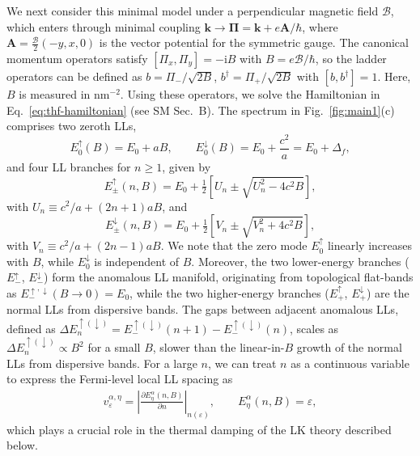 \documentclass[prl,twocolumn,superscriptaddress,float,aps]{revtex4-2}
\newcommand{\ii}{\mathrm{i}}
\newcommand{\kk}{\mathbf{k}}
\newcommand{\ELLminus}{E^{\uparrow}_{-}}
\newcommand{\ELLplus}{E^{\uparrow}_{+}}
\newcommand{\ELLTRminus}{E^{\downarrow}_{-}}
\newcommand{\ELLTRplus}{E^{\downarrow}_{+}}
\newcommand{\ELLzero}{E^{\uparrow}_{0}}
\newcommand{\ELLTRzero}{E^{\downarrow}_{0}}
\newcommand{\ELLpm}{E^{\uparrow}_{\pm}}
\newcommand{\ELLTRpm}{E^{\downarrow}_{\pm}}
\begin{document}
We next consider this minimal model under a perpendicular magnetic field $\mathcal{B}$, which enters through minimal coupling $\kk\to\boldsymbol{\Pi} = \kk + e\mathbf{A}/\hbar$, where $\mathbf{A} = \frac{\mathcal{B}}{2}(-y,x,0)$ is the vector potential for the symmetric gauge.
The canonical momentum operators satisfy $[\Pi_x,\Pi_y]=-\ii B$ with $B = e\mathcal{B}/\hbar$, so the ladder operators can be defined as $b = \Pi_-/\sqrt{2B}$, $b^{\dagger} = \Pi_+/\sqrt{2B}$ with $[b,b^{\dagger}]=1$. Here, \(B\) is measured in \(\mathrm{nm}^{-2}\). Using these operators, we solve the Hamiltonian in Eq.~\eqref{eq:thf-hamiltonian} (see SM Sec.~B). The spectrum in Fig.~\ref{fig:main1}(c) comprises two zeroth LLs,
\begin{equation}
	\ELLzero(B) = E_0 + aB,\qquad
	\ELLTRzero(B) = E_0 + \frac{c^{2}}{a} = E_0 + \Delta_f,
	\label{eq:zero-modes}
\end{equation}
and four LL branches for $n\ge 1$, given by
\begin{equation}
	\ELLpm(n,B) = E_0 + \tfrac12\!\left[U_n \pm \sqrt{U_n^{2} - 4c^{2}B}\right],
	\label{eq:ELL-energies}
\end{equation}
with $U_n \equiv c^{2}/a + (2n+1)aB$, and
\begin{equation}
	\ELLTRpm(n,B) = E_0 + \tfrac12\!\left[V_n \pm \sqrt{V_n^{2} + 4c^{2}B}\right],
	\label{eq:ELLTR-energies}
\end{equation}
with $V_n \equiv c^{2}/a + (2n-1)aB$.
We note that the zero mode $\ELLzero$ linearly increases with $B$, while $\ELLTRzero$ is independent of $B$. Moreover, the two lower-energy branches ($\ELLminus$, $\ELLTRminus$) form the anomalous LL manifold, originating from topological flat-bands as $E^{\uparrow,\downarrow}_{-}(B\rightarrow 0) = E_0$, while the two higher-energy branches ($\ELLplus$, $\ELLTRplus$) are the normal LLs from dispersive bands. The gaps between adjacent anomalous LLs, defined as $\Delta E^{\uparrow (\downarrow)}_n = E^{\uparrow (\downarrow)}_-(n+1)- E^{\uparrow (\downarrow)}_-(n)$, scales as $\Delta E^{\uparrow (\downarrow)}_n\propto B^{2}$ for a small $B$, slower than the linear-in-$B$ growth of the normal LLs from dispersive bands. For a large $n$, we can treat $n$ as a continuous variable to express the Fermi-level local LL spacing as
\begin{eqnarray}
   v_\varepsilon^{\alpha,\eta}
   =
   \left|\frac{\partial E^\alpha_\eta(n,B)}{\partial n}\right|_{n(\varepsilon)},
   \qquad
   E^\alpha_\eta(n,B)=\varepsilon,
   \label{eq:local-LL-spacing}
\end{eqnarray}
which plays a crucial role in the thermal damping of the LK theory described below. 
\end{document}
